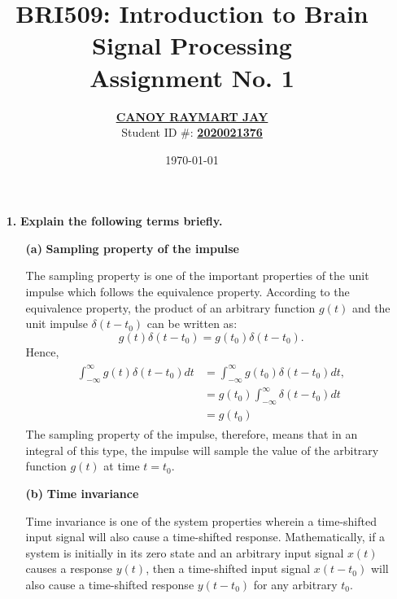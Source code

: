 \documentclass[a4paper, 12pt]{article}
\begin{document}
\title{BRI509: Introduction to Brain Signal Processing \\ Assignment No. 1}
\author{\underline{\textbf{CANOY RAYMART JAY}} \\ 
Student ID \#: \underline{\textbf{2020021376}}}
\date{\today}
\maketitle


\begin{itemize}
\item[\textbf{1.}]{\textbf{Explain the following terms briefly.}}
\begin{itemize}
\item[\textbf{(a)}]{\textbf{Sampling property of the impulse}}

\begin{tcolorbox}
The sampling property is one of the important properties of the unit impulse which follows the equivalence property. According to the equivalence property, the product of an arbitrary function $g(t)$ and the unit impulse $\delta (t - t_{0})$ can be written as:
\begin{equation}
g(t)\delta(t - t_{0}) = g(t_{0})\delta(t - t_{0}).
\end{equation}
Hence,
\begin{equation}
\begin{gathered}
\begin{alignedat}{1}
\int_{-\infty}^{\infty}{g(t)\delta(t - t_{0})dt} &= \int_{-\infty}^{\infty}{g(t_{0})\delta(t - t_{0})dt}, \\
&= g(t_{0})\int_{-\infty}^{\infty}{\delta(t - t_{0})dt} \\
&= g(t_{0})
\end{alignedat}
\end{gathered}
\end{equation}
The sampling property of the impulse, therefore, means that in an integral of this type, the impulse will sample the value of the arbitrary function $g(t)$ at time $t = t_{0}$. 
\end{tcolorbox}

\item[\textbf{(b)}]{\textbf{Time invariance}}

\begin{tcolorbox}
Time invariance is one of the system properties wherein a time-shifted input signal will also cause a time-shifted response. Mathematically, if a system is initially in its zero state and an arbitrary input signal $x(t)$ causes a response $y(t)$, then a time-shifted input signal $x(t - t_{0})$ will also cause a time-shifted response $y(t-t_{0})$ for any arbitrary $t_{0}$.
\end{tcolorbox}


\end{itemize}
\end{itemize}
\end{document}
